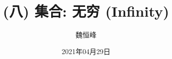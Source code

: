 \documentclass[]{beamer}
\title[(八) 无穷 (Infinity)]{(八) 集合: 无穷 (Infinity)}
\author[魏恒峰]{\large 魏恒峰}
\institute{hfwei@nju.edu.cn}
\date{2021年04月29日}
\begin{document}
\maketitle




% 

\thankyou{}

\end{document}
